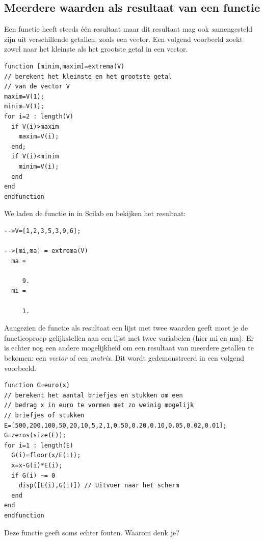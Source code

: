 \subsection{Meerdere waarden als resultaat van een functie}
Een functie heeft steeds \'e\'en resultaat maar dit resultaat mag ook \emph samengesteld zijn uit verschillende getallen, zoals een vector. Een volgend voorbeeld zoekt zowel naar het kleinste als het grootste getal in een vector.

\begin{lstlisting}[caption={Minimum en maximum van een vector}, label=minenmax]
function [minim,maxim]=extrema(V)
// berekent het kleinste en het grootste getal 
// van de vector V
maxim=V(1);
minim=V(1);
for i=2 : length(V)
  if V(i)>maxim
    maxim=V(i);
  end;
  if V(i)<minim
    minim=V(i);
  end
end
endfunction
\end{lstlisting}

We laden de functie in in Scilab en bekijken het resultaat:

\begin{lstlisting}[caption={Het minimum en maximum in het console venster}, label=minenmaxinscilex]
-->V=[1,2,3,5,3,9,6];

-->[mi,ma] = extrema(V)
  ma =
     
     9.
  mi =

     1.
\end{lstlisting}

Aangezien de functie als resultaat een lijst met twee waarden geeft moet je de functieoproep gelijkstellen aan een lijst met twee variabelen (hier mi en ma). Er is echter nog een andere mogelijkheid om een resultaat van meerdere getallen te bekomen: een \emph{vector} of een \emph{matrix}. Dit wordt gedemonstreerd in een volgend voorbeeld.

\begin{lstlisting}[caption={Functie euro(x)}, label=euro]
function G=euro(x)
// berekent het aantal briefjes en stukken om een
// bedrag x in euro te vormen met zo weinig mogelijk
// briefjes of stukken
E=[500,200,100,50,20,10,5,2,1,0.50,0.20,0.10,0.05,0.02,0.01];
G=zeros(size(E));
for i=1 : length(E)
  G(i)=floor(x/E(i));
  x=x-G(i)*E(i);
  if G(i) ~= 0
    disp([E(i),G(i)]) // Uitvoer naar het scherm
  end
end
endfunction
\end{lstlisting}

Deze functie geeft soms echter fouten. Waarom denk je?





